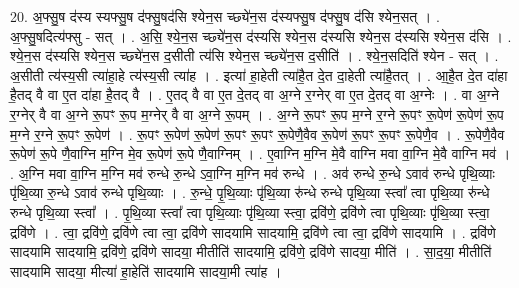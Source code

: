 \documentclass[17pt]{extarticle}
\begin{document}
20. अ॒फ्सु॒ष द॑स्य स्यफ्सु॒ष द॑फ्सु॒षद॑सि श्येन॒स च्छ्ये॑न॒स द॑स्यफ्सु॒ष द॑फ्सु॒ष द॑सि श्येन॒सत् । . अ॒फ्सु॒षदित्य॑फ्सु - सत् । . अ॒सि॒ श्ये॒न॒स च्छ्ये॑न॒स द॑स्यसि श्येन॒स द॑स्यसि श्येन॒स द॑स्यसि श्येन॒स द॑सि । . श्ये॒न॒स द॑स्यसि श्येन॒स च्छ्ये॑न॒स द॒सीती त्य॑सि श्येन॒स च्छ्ये॑न॒स द॒सीति॑ । . श्ये॒न॒सदिति॑ श्येन - सत् । . अ॒सीती त्य॑स्य॒सी त्या॑हा॒हे त्य॑स्य॒सी त्या॑ह । . इत्या॑ हा॒हेती त्या॑है॒त दे॒त दा॒हेती त्या॑है॒तत् । . आ॒है॒त दे॒त दा॑हा है॒तद् वै वा ए॒त दा॑हा है॒तद् वै । . ए॒तद् वै वा ए॒त दे॒तद् वा अ॒ग्ने र॒ग्नेर् वा ए॒त दे॒तद् वा अ॒ग्नेः । . वा अ॒ग्ने र॒ग्नेर् वै वा अ॒ग्ने रू॒पꣳ रू॒प म॒ग्नेर् वै वा अ॒ग्ने रू॒पम् । . अ॒ग्ने रू॒पꣳ रू॒प म॒ग्ने र॒ग्ने रू॒पꣳ रू॒पेण॑ रू॒पेण॑ रू॒प म॒ग्ने र॒ग्ने रू॒पꣳ रू॒पेण॑ । . रू॒पꣳ रू॒पेण॑ रू॒पेण॑ रू॒पꣳ रू॒पꣳ रू॒पेणै॒वैव रू॒पेण॑ रू॒पꣳ रू॒पꣳ रू॒पेणै॒व । . रू॒पेणै॒वैव रू॒पेण॑ रू॒पे णै॒वाग्नि म॒ग्नि मे॒व रू॒पेण॑ रू॒पे णै॒वाग्निम् । . ए॒वाग्नि म॒ग्नि मे॒वै वाग्नि मवा वा॒ग्नि मे॒वै वाग्नि मव॑ । . अ॒ग्नि मवा वा॒ग्नि म॒ग्नि मव॑ रुन्धे रु॒न्धे ऽवा॒ग्नि म॒ग्नि मव॑ रुन्धे । . अव॑ रुन्धे रु॒न्धे ऽवाव॑ रुन्धे पृथि॒व्याः पृ॑थि॒व्या रु॒न्धे ऽवाव॑ रुन्धे पृथि॒व्याः । . रु॒न्धे॒ पृ॒थि॒व्याः पृ॑थि॒व्या रु॑न्धे रुन्धे पृथि॒व्या स्त्वा᳚ त्वा पृथि॒व्या रु॑न्धे रुन्धे पृथि॒व्या स्त्वा᳚ । . पृ॒थि॒व्या स्त्वा᳚ त्वा पृथि॒व्याः पृ॑थि॒व्या स्त्वा॒ द्रवि॑णे॒ द्रवि॑णे त्वा पृथि॒व्याः पृ॑थि॒व्या स्त्वा॒ द्रवि॑णे । . त्वा॒ द्रवि॑णे॒ द्रवि॑णे त्वा त्वा॒ द्रवि॑णे सादयामि सादयामि॒ द्रवि॑णे त्वा त्वा॒ द्रवि॑णे सादयामि । . द्रवि॑णे सादयामि सादयामि॒ द्रवि॑णे॒ द्रवि॑णे सादया॒ मीतीति॑ सादयामि॒ द्रवि॑णे॒ द्रवि॑णे सादया॒ मीति॑ । . सा॒द॒या॒ मीतीति॑ सादयामि सादया॒ मीत्या॑ हा॒हेति॑ सादयामि सादया॒मी त्या॑ह । \newline
\end{document}
